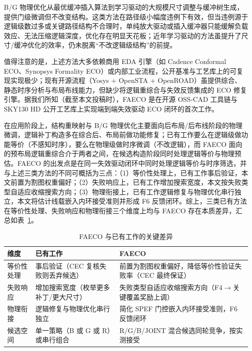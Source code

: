 \documentclass[journal]{IEEEtran}
\begin{document}
B/G 物理优化从最优缓冲插入算法\cite{liang2012buffer}到学习驱动的大规模尺寸调整与缓冲树生成\cite{liu2021rlsizer,huang2025phys,chen2024aito,zhang2025buffalo}，提供门级微调但不改变结构。这类方法在路径级小幅度违例下有效，但当违例源于逻辑级数过多或关键路径结构不合理时，单纯放大驱动或插入缓冲器只能缓解负载效应、无法压缩逻辑深度，优化存在明显天花板\cite{liu2021rlsizer,huang2025phys}；近年学习驱动的方法\cite{chen2024aito,zhang2025buffalo}虽提升了尺寸/缓冲优化的效率，仍未脱离“不改逻辑级结构”的前提。

值得注意的是，上述方法大多依赖商用 EDA 引擎（如 Cadence Conformal ECO、Synopsys Formality ECO）或内部工业流程，公开基准与工艺库上的可复现实现极少；现有开源流程（Yosys + OpenSTA + OpenROAD）虽提供综合、静态时序分析与布局布线能力，但缺少将逻辑重综合与失效反馈集成的 ECO 修复引擎。据我们所知（截至本文投稿时），FAECO 是在开源 OSS-CAD 工具链与 SKY130 HD 公开工艺库上实现端到端失效驱动 ECO 闭环的首次工作。

在应用阶段上，结构重映射与 B/G 物理优化主要面向后布局/后布线阶段的物理微调，逻辑补丁构造多在综合后、布局前做功能修复；已有工作要么在逻辑级做功能等价（不感知时序），要么在物理级做时序微调（不改逻辑），而 FAECO 面向的预布局逻辑重综合介于两者之间，在候选构造阶段同时处理逻辑等价与物理预估。FAECO 的出发点是在同一失效驱动闭环中同时处理逻辑等价与时序筛选，并与上述三类方法的不同可概括为三点：（1）等价性处理上，已有工作事后验证，本文前置为割图权重偏好；（2）失败响应上，已有工作增加搜索宽度，本文按失败类型自适应收缩搜索方向；（3）物理衔接上，已有工作逻辑修复与物理优化串行独立，本文将估计线载嵌入内环接受准则并形成 F6 反馈闭环。综上，三类已有方法在等价性处理、失败响应和物理衔接三个维度上均与 FAECO 存在本质差异，汇总如表~\ref{tab:related_diff}。

\begin{table}[!t]
\centering
\caption{FAECO 与已有工作的关键差异}
\label{tab:related_diff}
\footnotesize
\setlength{\tabcolsep}{3pt}
\begin{tabular}{p{2.2cm}p{2.8cm}p{3.2cm}}
\toprule
\textbf{维度} & \textbf{已有工作} & \textbf{FAECO} \\
\midrule
等价性处理 & 事后验证（CEC 复核失败则丢弃候选） & 前置为割图权重偏好，降低等价性验证失败率（CEC 最终保证） \\
失败响应 & 增加搜索宽度（枚举更多补丁/更大尺寸） & 失败类型自适应收缩搜索方向（F4$\to$关键覆盖奖励上调） \\
物理衔接 & 逻辑修复与物理优化串行独立 & 简化 SPEF 门控嵌入内环接受准则，F6 反馈闭环 \\
候选空间 & 单一策略（B 或 G 或 R）或串行组合 & R/G/B/JOINT 混合候选同轮竞争，按实测接受 \\
\bottomrule
\end{tabular}
\end{table}
\end{document}
